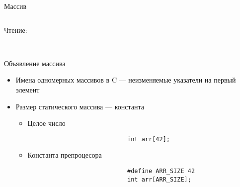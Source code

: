 \documentclass[aspectratio=169,14pt]{beamer}
\begin{document}
\begin{frame}[fragile,t]{Массив}
\begin{onlyenv}
\begin{columns}
\begin{column}{0.5\textwidth}
                    \begin{center}
                        \begin{minipage}{0.9\textwidth}
                            {\color{maincolor}Чтение:} \\
                             \\
                        \end{minipage}
                    \end{center}
                \end{column}
            \end{columns}
        \end{onlyenv}
    \end{frame}

    \begin{frame}[fragile]{Объявление массива}
        \begin{itemize}
            \item<1-> Имена одномерных массивов в C --- неизменяемые указатели на первый элемент
            \item<2-> Размер статического массива --- константа
                \begin{itemize}
                    \item<3-> Целое число
                        \begin{verbatim}
                            int arr[42];
                        \end{verbatim}
                    \item<4-> Константа препроцесора
                        \begin{verbatim}
                            #define ARR_SIZE 42
                            int arr[ARR_SIZE];
                        \end{verbatim}
                \end{itemize}
        \end{itemize}
    \end{frame}
\end{document}
